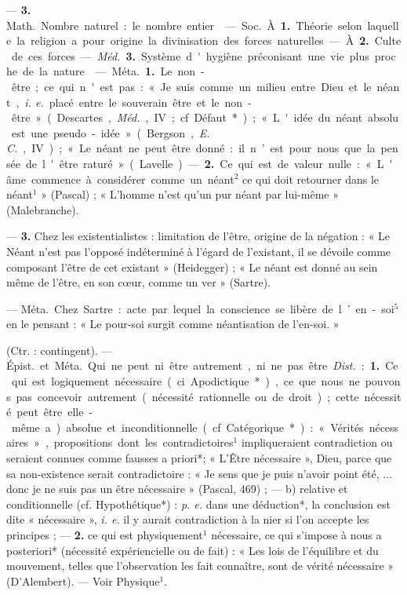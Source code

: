 \begin{itemize}[leftmargin=1cm, label=, itemsep=1pt]
— {\bf 3.} \si{Math.} Nombre naturel : le
nombre entier.

 — \si{Soc.} À. {\bf 1.} Théorie selon
laquelle la religion a pour origine
la divinisation des forces naturelles.
— À. {\bf 2.} Culte de ces forces.

— \si{{\it Méd.}} {\bf 3.} Système d'hygiène
préconisant une vie plus proche
de la nature.

 — \si{Méta.} {\bf 1.} Le non-être ; ce qui
n'est pas : «Je suis comme un milieu
entre Dieu et le néant, {\it i. e.} placé
entre le souverain être et le non-être » (Descartes, \si{{\it Méd.}}, IV ; cf.
Défaut*) ; « L'idée du néant absolu
est une pseudo-idée » (Bergson,
{\it E. C.}, IV) ; « Le néant ne peut être
donné : il n’est pour nous que la
pensée de l'être raturé » (Lavelle). —
 {\bf 2.} Ce qui est de valeur nulle : « L'âme
commence à considérer comme un
néant$^2$ ce qui doit retourner dans le
néant$^1$ » (Pascal) ; « L'homme n’est
qu'un pur néant par lui-même »
(Malebranche).

— {\bf 3.} Chez les existentialistes :
limitation de l'être, origine de la
négation : « Le Néant n'est pas
l'opposé indéterminé à l'égard de
l'existant, il se dévoile comme composant l'être de cet existant »
(Heidegger) ; « Le néant est donné
au sein même de l'être, en son cœur,
comme un ver » (Sartre).

 — \si{Méta.} Chez Sartre :
acte par lequel la conscience se libère
de l’en-soi$^5$ en le pensant : « Le pour-soi surgit comme néantisation de
l'en-soi. »

 (Ctr. : contingent). — \si{Épist.}
et \si{Méta.} Qui ne peut ni être autrement, ni ne pas être. {\it Dist.} : {\bf 1.} Ce
qui est logiquement nécessaire (ci.
Apodictique*), ce que nous ne pouvons pas concevoir autrement (nécessité rationnelle ou de droit) ; cette
nécessité peut être elle-même
a) absolue et inconditionnelle (cf.
Catégorique*) : « Vérités nécessaires »,
propositions dont les contradictoires$^1$
impliqueraient contradiction ou seraient connues comme fausses a
priori*; « L'Être nécessaire », Dieu,
parce que sa non-existence serait
contradictoire : « Je sens que je
puis n’avoir point été, ... donc je ne
suis pas un être nécessaire » (Pascal,
469) ; — b) relative et conditionnelle
(cf. Hypothétique*) : {\it p. e.} dans une
déduction*, la conclusion est dite
« nécessaire », {\it i. e.} il y aurait contradiction à la nier si l’on accepte les
principes ; — {\bf 2.} ce qui est physiquement$^1$ nécessaire, ce qui s'impose à
nous a posteriori* (nécessité expériencielle ou de fait) : « Les lois de
l'équilibre et du mouvement, telles
que l'observation les fait connaître,
sont de vérité nécessaire » (D’Alembert). — Voir Physique$^1$.


\end{itemize}
